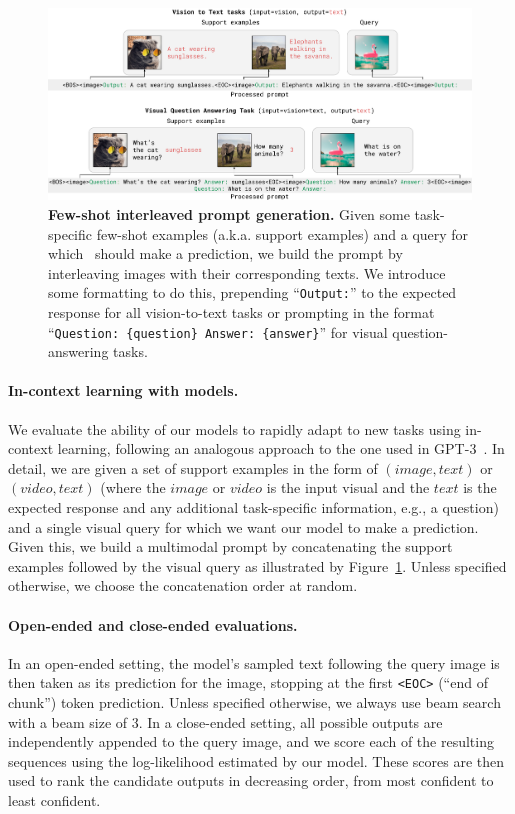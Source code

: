 \begin{figure}[t]
\includegraphics[width=\linewidth]{figures/fig_fewshot_prompt.pdf}
\centering
\caption{\capfontsize{} \textbf{Few-shot interleaved prompt generation.}
Given some task-specific few-shot examples (a.k.a.  support examples) and a query for which~\method{} should make a prediction, we build the prompt by interleaving images with their corresponding texts.
We introduce some formatting to do this, prepending
``\texttt{\color{greencode}Output:}'' to the expected response for all vision-to-text tasks or prompting in the format ``\texttt{\color{greencode}Question:~\{question\}\color{greencode}~Answer:~\{answer\}}'' for visual question-answering tasks.
}
\label{fig:fewshot_prompt}
\end{figure}


\paragraph{In-context learning with \method{} models.}
We evaluate the ability of our models to rapidly adapt to new tasks using in-context learning, following an analogous approach to the one used in GPT-3~\citep{gpt3}.
In detail, we are given a set of support examples in the form of $(image, text)$ or $(video, text)$ (where the $image$ or $video$ is the input visual and the $text$ is the expected response and any additional task-specific information, e.g., a question) and a single visual query for which we want our model to make a prediction.
Given this, we build a multimodal prompt by concatenating the support examples followed by the visual query as illustrated by Figure~\ref{fig:fewshot_prompt}.
Unless specified otherwise, we choose the concatenation order at random.


\paragraph{Open-ended and close-ended evaluations.}
In an open-ended setting, the model's sampled text following the query image is then taken as its prediction for the image, stopping at the first \texttt{<EOC>} (``end of chunk'') token prediction.
Unless specified otherwise, we always use beam search with a beam size of 3.
In a close-ended setting, all possible outputs are independently appended to the query image, and we score each of the resulting sequences using the log-likelihood estimated by our model.
These scores are then used to rank the candidate outputs in decreasing order, from most confident to least confident.


